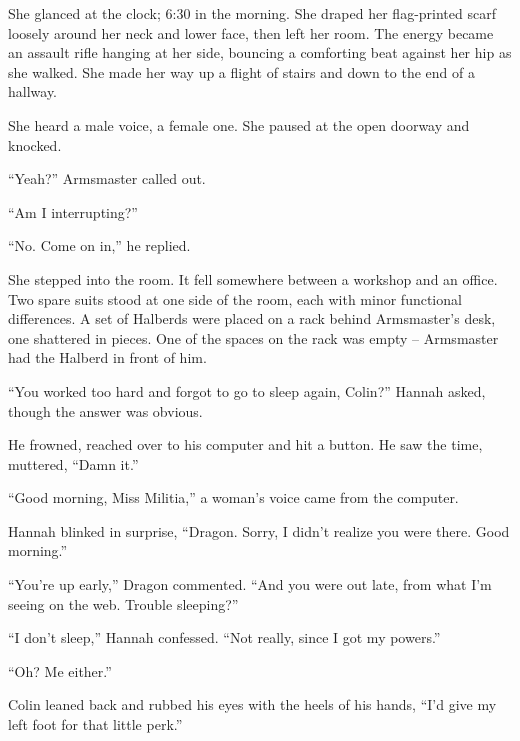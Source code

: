 She glanced at the clock; 6:30 in the morning.  She draped her flag-printed scarf loosely around her neck and lower face, then left her room.  The energy became an assault rifle hanging at her side, bouncing a comforting beat against her hip as she walked. She made her way up a flight of stairs and down to the end of a hallway.



She heard a male voice, a female one.  She paused at the open doorway and knocked.



``Yeah?'' Armsmaster called out.



``Am I interrupting?''



``No.  Come on in,'' he replied.



She stepped into the room.  It fell somewhere between a workshop and an office.  Two spare suits stood at one side of the room, each with minor functional differences.  A set of Halberds were placed on a rack behind Armsmaster's desk, one shattered in pieces.  One of the spaces on the rack was empty – Armsmaster had the Halberd in front of him.



``You worked too hard and forgot to go to sleep again, Colin?'' Hannah asked, though the answer was obvious.



He frowned, reached over to his computer and hit a button.  He saw the time, muttered, ``Damn it.''



``Good morning, Miss Militia,'' a woman's voice came from the computer.



Hannah blinked in surprise, ``Dragon.  Sorry, I didn't realize you were there.  Good morning.''



``You're up early,'' Dragon commented. ``And you were out late, from what I'm seeing on the web.  Trouble sleeping?''



``I don't sleep,'' Hannah confessed.  ``Not really, since I got my powers.''



``Oh?  Me either.''



Colin leaned back and rubbed his eyes with the heels of his hands, ``I'd give my left foot for that little perk.''



